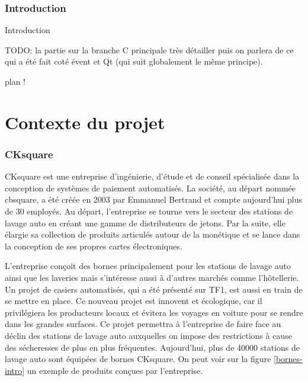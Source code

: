\documentclass[a4paper]{article}
\begin{document}
\clearpage{}

\pagestyle{plain}
\setcounter{page}{1}
\clearpage
\section*{Introduction}

Introduction

TODO: la partie sur la branche C principale très détailler puis on parlera de ce
qui a été fait coté évent et Qt (qui suit globalement le même principe).

plan !

\clearpage{}



\part{Contexte du projet}

\section{CKsquare}%

CKsquare est une entreprise d'ingénierie, d'étude et de conseil spécialisée dans
la conception de systèmes de paiement automatisés. La société, au départ nommée
cbsquare, a été créée en 2003 par Emmanuel Bertrand et compte aujourd'hui plus
de 30 employés. Au départ, l'entreprise se tourne vers le secteur des stations
de lavage auto en créant une gamme de distributeurs de jetons. Par la suite,
elle élargie sa collection de produits articulés autour de la monétique et se
lance dans la conception de ses propres cartes électroniques.

L'entreprise conçoit des bornes principalement pour les stations de lavage auto
ainsi que les laveries mais s'intéresse aussi à d'autres marchés comme
l'hôtellerie. Un projet de casiers automatisés, qui a été présenté sur TF1, est
aussi en train de se mettre en place. Ce nouveau projet est innovent et
écologique, car il privilégiera les producteurs locaux et évitera les voyages en
voiture pour se rendre dans les grandes surfaces. Ce projet permettra à
l'entreprise de faire face au déclin des stations de lavage auto auxquelles on
impose des restrictions à cause des sécheresses de plus en plus fréquentes.
Aujourd'hui, plus de 40000 stations de lavage auto sont équipées de bornes
CKsquare. On peut voir sur la figure \ref{bornes-intro} un exemple de produits
conçues par l'entreprise.
\end{document}
